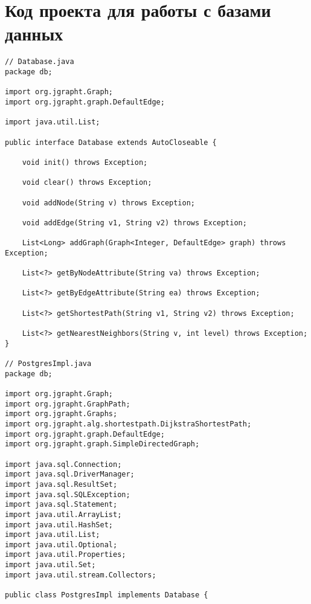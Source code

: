 \chapter{Код проекта для работы с базами данных}

\begin{lstlisting}
// Database.java
package db;

import org.jgrapht.Graph;
import org.jgrapht.graph.DefaultEdge;

import java.util.List;

public interface Database extends AutoCloseable {

    void init() throws Exception;

    void clear() throws Exception;

    void addNode(String v) throws Exception;

    void addEdge(String v1, String v2) throws Exception;

    List<Long> addGraph(Graph<Integer, DefaultEdge> graph) throws Exception;

    List<?> getByNodeAttribute(String va) throws Exception;

    List<?> getByEdgeAttribute(String ea) throws Exception;

    List<?> getShortestPath(String v1, String v2) throws Exception;

    List<?> getNearestNeighbors(String v, int level) throws Exception;
}

// PostgresImpl.java
package db;

import org.jgrapht.Graph;
import org.jgrapht.GraphPath;
import org.jgrapht.Graphs;
import org.jgrapht.alg.shortestpath.DijkstraShortestPath;
import org.jgrapht.graph.DefaultEdge;
import org.jgrapht.graph.SimpleDirectedGraph;

import java.sql.Connection;
import java.sql.DriverManager;
import java.sql.ResultSet;
import java.sql.SQLException;
import java.sql.Statement;
import java.util.ArrayList;
import java.util.HashSet;
import java.util.List;
import java.util.Optional;
import java.util.Properties;
import java.util.Set;
import java.util.stream.Collectors;

public class PostgresImpl implements Database {


\end{lstlisting}
